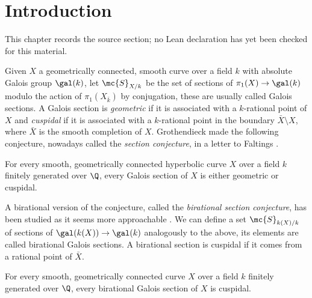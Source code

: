 \chapter{Introduction}
\label{birational-section-conjecture-strong-birationality-chapter-01}

\begin{remark}
\label{birational-section-conjecture-strong-birationality-chapter-01-source}
This chapter records the source section; no Lean declaration has yet been checked for this material.
\notready
\end{remark}

Given $X$ a geometrically connected, smooth curve over a field $k$ with absolute Galois group $\gal(k)$, let $\mc{S}_{X/k}$ be the set of sections of $\pi_{1}(X)\to\gal(k)$ modulo the action of $\pi_{1}(X_{\bar{k}})$ by conjugation, these are usually called Galois sections. A Galois section is \emph{geometric} if it is associated with a $k$-rational point of $X$ and \emph{cuspidal} if it is associated with a $k$-rational point in the boundary $\bar{X}\setminus X$, where $\bar{X}$ is the smooth completion of $X$. Grothendieck made the following conjecture, nowadays called the \emph{section conjecture}, in a letter to Faltings \cite{gro97}.

\begin{SC}
\notready
    For every smooth, geometrically connected hyperbolic curve $X$ over a field $k$ finitely generated over $\Q$, every Galois section of $X$ is either geometric or cuspidal.
\end{SC}

A birational version of the conjecture, called the \emph{birational section conjecture}, has been studied as it seems more approachable \cite{koe05} \cite{sti15} \cite{saty21}. We can define a set $\mc{S}_{k(X)/k}$ of sections of $\gal(k(X))\to\gal(k)$ analogously to the above, its elements are called birational Galois sections. A birational section is cuspidal if it comes from a rational point of $\bar{X}$.

\begin{BSC}
\notready
    For every smooth, geometrically connected curve $X$ over a field $k$ finitely generated over $\Q$, every birational Galois section of $X$ is cuspidal.
\end{BSC}

